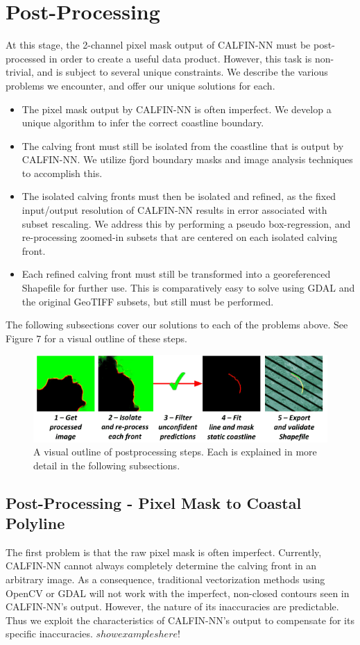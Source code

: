 \documentclass[tc, manuscript]{copernicus}
\begin{document}
\section{Post-Processing}
At this stage, the 2-channel pixel mask output of CALFIN-NN must be post-processed in order to create a useful data product. However, this task is non-trivial, and is subject to several unique constraints. We describe the various problems we encounter, and offer our unique solutions for each.
\begin{itemize}
\item The pixel mask output by CALFIN-NN is often imperfect. We develop a unique algorithm to infer the correct coastline boundary.
\item The calving front must still be isolated from the coastline that is output by CALFIN-NN. We utilize fjord boundary masks and image analysis techniques to accomplish this.
\item The isolated calving fronts must then be isolated and refined, as the fixed input/output resolution of CALFIN-NN results in error associated with subset rescaling. We address this by performing a pseudo box-regression, and re-processing zoomed-in subsets that are centered on each isolated calving front.
\item Each refined calving front must still be transformed into a georeferenced Shapefile for further use. This is comparatively easy to solve using GDAL and the original GeoTIFF subsets, but still must be performed.
\end{itemize}
The following subsections cover our solutions to each of the problems above. See Figure 7 for a visual outline of these steps.

\begin{figure}[t]
\includegraphics[width=14cm]{pipeline-postprocess.png}
\centering
\caption{A visual outline of postprocessing steps. Each is explained in more detail in the following subsections.}
\end{figure}

\subsection{Post-Processing - Pixel Mask to Coastal Polyline}
The first problem is that the raw pixel mask is often imperfect. Currently, CALFIN-NN cannot always completely determine the calving front in an arbitrary image. As a consequence, traditional vectorization methods using OpenCV or GDAL will not work with the imperfect, non-closed contours seen in  CALFIN-NN's output. However, the nature of its inaccuracies are predictable. Thus we exploit the characteristics of CALFIN-NN's output to compensate for its specific inaccuracies. $show examples here!$
\end{document}
